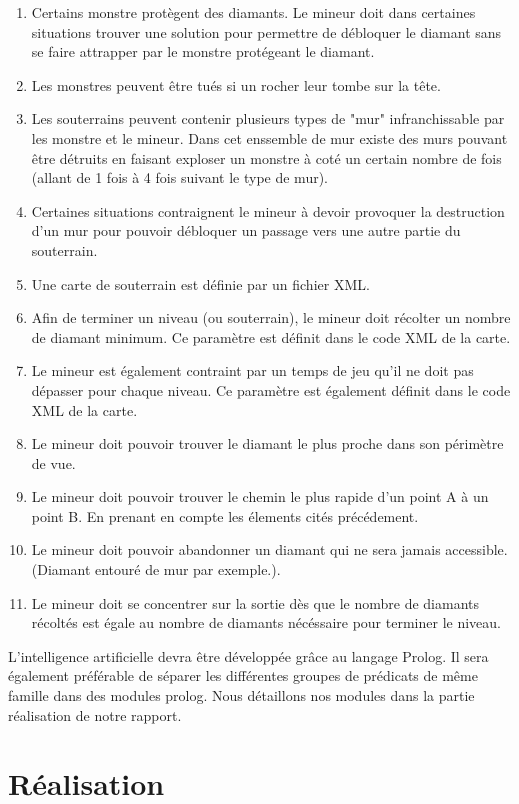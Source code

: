 \documentclass[a4paper,11pt]{article}
\begin{document}
\begin{enumerate}
			\item Certains monstre protègent des diamants. Le mineur doit dans certaines situations trouver une solution pour permettre de débloquer le diamant sans se faire attrapper par le monstre protégeant le diamant.
			\item Les monstres peuvent être tués si un rocher leur tombe sur la tête.
			\item Les souterrains peuvent contenir plusieurs types de "mur" infranchissable par les monstre et le mineur. Dans cet enssemble de mur existe des murs pouvant être détruits en faisant exploser un monstre à coté un certain nombre de fois (allant de 1 fois à 4 fois suivant le type de mur).
			\item Certaines situations contraignent le mineur à devoir provoquer la destruction d'un mur pour pouvoir débloquer un passage vers une autre partie du souterrain.
			\item Une carte de souterrain est définie par un fichier XML.
			\item Afin de terminer un niveau (ou souterrain), le mineur doit récolter un nombre de diamant minimum. Ce paramètre est définit dans le code XML de la carte.
			\item Le mineur est également contraint par un temps de jeu qu'il ne doit pas dépasser pour chaque niveau. Ce paramètre est également définit dans le code XML de la carte.
			\item Le mineur doit pouvoir trouver le diamant le plus proche dans son périmètre de vue.
			\item Le mineur doit pouvoir trouver le chemin le plus rapide d'un point A à un point B. En prenant en compte les élements cités précédement.
			\item Le mineur doit pouvoir abandonner un diamant qui ne sera jamais accessible. (Diamant entouré de mur par exemple.).
			\item Le mineur doit se concentrer sur la sortie dès que le nombre de diamants récoltés est égale au nombre de diamants nécéssaire pour terminer le niveau.
		\end{enumerate}
		
L'intelligence artificielle devra être développée grâce au langage Prolog. Il sera également préférable de séparer les différentes groupes de prédicats de même famille dans des modules prolog. Nous détaillons nos modules dans la partie réalisation de notre rapport.
	
	\newpage
	\section{Réalisation}
	
\end{document}
